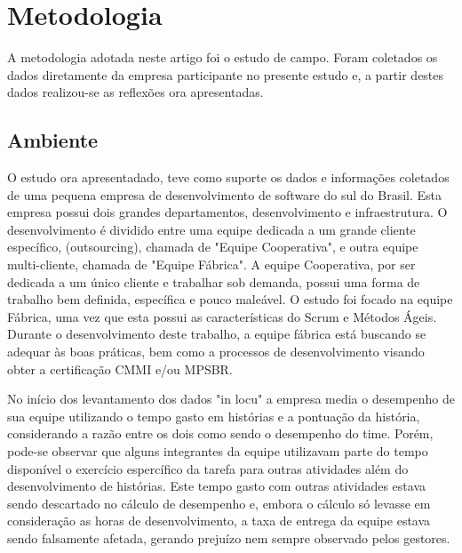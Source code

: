 \section{Metodologia}
A metodologia adotada neste artigo foi o estudo de campo. Foram coletados os dados diretamente da empresa participante no presente estudo e, a partir destes dados realizou-se as reflexões ora apresentadas.\par

\subsection{Ambiente}
O estudo ora apresentadado, teve como suporte os dados e informações coletados de uma pequena empresa de desenvolvimento de software do sul do Brasil. Esta empresa possui dois grandes departamentos, desenvolvimento e infraestrutura. O desenvolvimento é dividido entre uma equipe dedicada a um grande cliente específico,  (outsourcing), chamada de "Equipe Cooperativa", e outra equipe multi-cliente, chamada de "Equipe Fábrica". A equipe Cooperativa, por ser dedicada a um único cliente e trabalhar sob demanda, possui uma forma de trabalho bem definida, específica e pouco maleável. O estudo foi focado na equipe Fábrica, uma vez que esta possui as características do Scrum e Métodos Ágeis. Durante o desenvolvimento deste trabalho, a equipe fábrica está buscando se adequar às boas práticas, bem como a processos de desenvolvimento visando  obter a certificação CMMI e/ou MPSBR.\par
No início dos levantamento dos dados "in locu"  a empresa media o desempenho de sua equipe utilizando o tempo gasto em histórias e a pontuação da história, considerando a razão entre os dois como sendo o desempenho do time. Porém, pode-se observar que alguns integrantes da equipe utilizavam parte do tempo disponível o exercício espercífico da tarefa para outras atividades além do desenvolvimento de histórias. Este tempo gasto com outras atividades estava sendo descartado no cálculo de desempenho e, embora o cálculo só levasse em consideração as horas de desenvolvimento, a taxa de entrega da equipe estava sendo falsamente afetada, gerando prejuízo nem sempre observado pelos gestores.\par

